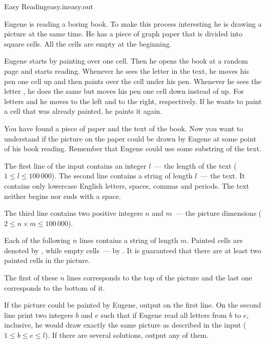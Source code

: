 \begin{problem}{Easy Reading}{easy.in}{easy.out}{\timeLimit}


Eugene is reading a boring book. To make this process interesting he
is drawing a picture at the same time. He has a piece of graph paper that is divided
into square cells. All the cells are empty at the beginning.

Eugene starts by painting over one cell. Then he opens the book at a random
page and starts reading. Whenever he sees the letter  in the text, he moves his
pen one cell up and then paints over the cell under his pen. Whenever he sees
the letter , he does the same but moves his pen one cell down instead of up. For
letters  and  he moves to the left and to the right, respectively. If he wants to
paint a cell that was already painted, he paints it again.

You have found a piece of paper and the text of the book. 
Now you want to understand if the picture on the paper could be drawn by 
Eugene at some point of his book reading.
Remember that Eugene could use some substring of the text.

\InputFile

The first line of the input contains an integer $l$~--- the length of the text
($1 \le l \le 100\,000$).
The second line contains a string of length $l$~--- the text.
It contains only lowercase English letters, spaces, commas and periods.
The text neither begins nor ends with a space.

The third line contains two positive integers $n$ and $m$~--- the picture dimensions
($2 \le n \times m \le 100\,000$).

Each of the following $n$ lines contains a string of length $m$. Painted cells
are denoted by , while empty cells~--- by .
It is guaranteed that there are at least two painted cells in the picture.

The first of these $n$ lines corresponds to the top of the picture and the last one
corresponds to the bottom of it.

\OutputFile

If the picture could be painted by Eugene, output  on the first line. 
On the second line print two integers $b$ and $e$
such that if Eugene read all letters from $b$ to $e$, inclusive, he would draw
exactly the same picture as described in the input ($1 \le b \le e \le l$).
If there are several solutions, output any of them.


\end{problem}
